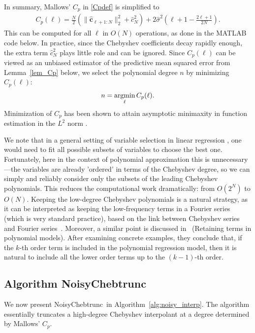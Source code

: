 \documentclass[final,onefignum,onetabnum]{siamart220329}
\def\mainalg{NoisyChebtrunc}
\newcommand{\argmin}{\mathop{\rm argmin}\limits}
\newcommand{\vct}[1]{\bm{#1}}
\begin{document}
In summary, Mallows' $C_p$ in \eqref{Cpdef} is simplified to
\begin{align}\label{Cpdefsimple}
	C_p(\ell) = 
	\frac{N}{2}(\|\hat{\vct{c}}_{\ell+1:N}\|_2^2+\hat{c}_{N}^2)+ 2  \hat{\sigma}^2 \left( \ell+1-\frac{2\ell+1}{2N} \right).
\end{align}
This can be computed for all $\ell$ in $O(N)$ operations, as done in the MATLAB code below. 
In practice, since the Chebyshev coefficients decay rapidly enough, the extra term $\hat{c}_{N}^2$ plays little role and can be ignored. 
Since $C_p(\ell)$ can be viewed as an unbiased {estimator} of the predictive mean squared error from Lemma~\ref{lem_Cp} below, we select the polynomial degree $n$ by minimizing $C_p(\ell)$:
\[
n = \argmin_\ell C_p(\ell).
\]
Minimization of $C_p$ has been shown to attain asymptotic minimaxity in function estimation {in the $L^2$ norm} \cite{massart2001gaussian,tsybakov}.

We note that in a general setting of variable selection in linear regression \cite{james2013introduction}, one would need to fit all possible subsets of variables to choose the best one. Fortunately, here in the context of polynomial approximation this is unnecessary---the variables are already 'ordered' in terms of the Chebyshev degree, so we can simply and reliably consider only the subsets of the leading Chebyshev polynomials. This reduces the computational work dramatically: from $O(2^N)$ to $O(N)$. 
Keeping the low-degree Chebyshev polynomials is a natural strategy, as it can be interpreted as keeping the low-frequency terms in a Fourier series (which is very standard practice), based on the link between Chebyshev series and Fourier series~\cite[Ch.~3]{trefethenatap}. Moreover, a similar point is discussed in~\cite[\S~12.3]{draper1998applied} (Retaining terms in polynomial models). After examining concrete examples, they conclude that, if the $k$-th order term is included in the polynomial regression model, then it is natural to include all the lower order terms up to the $(k-1)$-th order.

\subsection{Algorithm \mainalg}
We now present \mainalg\ in Algorithm~\ref{alg:noisy_interp}. The algorithm essentially truncates {a high-degree} Chebyshev interpolant at a degree determined by Mallows' $C_p$. 
\end{document}
